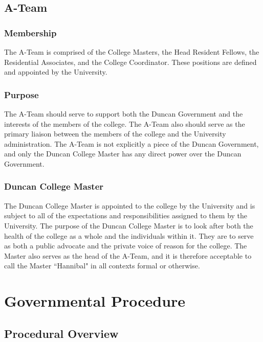 \documentclass[USletter,12pt]{article}
\begin{document}
\subsection{A-Team}

\subsubsection{Membership}
The A-Team is comprised of the College Masters, the Head Resident Fellows, the Residential Associates, and the College Coordinator.  These positions are defined and appointed by the University.

\subsubsection{Purpose}
The A-Team should serve to support  both the Duncan Government and the interests of the members of the college.  The A-Team also should serve as the primary liaison between the members of the college and the University administration.  The A-Team is not explicitly a piece of the Duncan Government, and only the Duncan College Master has any direct power over the Duncan Government.

\subsubsection{Duncan College Master}
The Duncan College Master is appointed to the college by the University and is subject to all of the expectations and responsibilities assigned to them by the University.  The purpose of the Duncan College Master is to look after both the health of the college as a whole and the individuals within it.  They are to serve as both a public advocate and the private voice of reason for the college.  The Master also serves as the head of the A-Team, and it is therefore acceptable to call the Master ``Hannibal" in all contexts formal or otherwise.

\section{Governmental Procedure}


\subsection{Procedural Overview}
\end{document}
